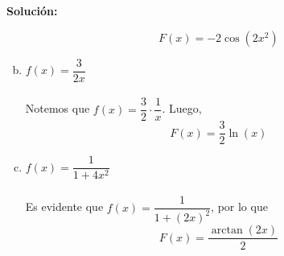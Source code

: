 \documentclass[12pt]{article}
\newenvironment{solucion}
{\begin{mdframed}[backgroundcolor=black!10]
		{\bf Solución:}\\
	}
	{
	\end{mdframed}
}
\newenvironment{preguntas}
{\begin{enumerate}\itemsep12pt
	}
	{
	\end{enumerate}
}
\begin{document}
\begin{preguntas}
\begin{solucion}
\begin{enumerate}[a)]
$$F(x) = -2\cos(2x^2)$$
\item $f(x) = \dfrac{3}{2x}$\\
\\
Notemos que $f(x) = \dfrac{3}{2} \cdot \dfrac{1}{x}$. Luego,
$$F(x) = \dfrac{3}{2} \ln(x)$$
\item $f(x) = \dfrac{1}{1+4x^2}$\\
\\
Es evidente que $f(x)= \dfrac{1}{1+(2x)^2}$, por lo que
$$F(x) = \dfrac{\arctan(2x)}{2}$$
\end{enumerate}
\end{solucion}
\end{preguntas}
\end{document}
